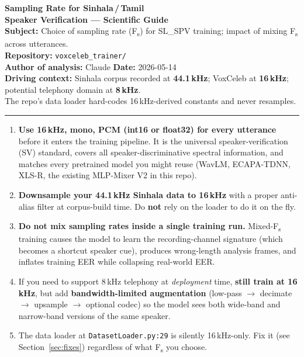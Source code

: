 \documentclass[11pt,a4paper]{article}
\begin{document}
\begin{center}
  {\LARGE\bfseries Sampling Rate for Sinhala\,/\,Tamil\\[4pt]
  Speaker Verification --- Scientific Guide}\\[10pt]
  {\normalsize
  \textbf{Subject:} Choice of sampling rate (F\textsubscript{s}) for SL\_SPV training; impact of mixing F\textsubscript{s} across utterances.\\
  \textbf{Repository:} \texttt{voxceleb\_trainer/}\\
  \textbf{Author of analysis:} Claude \quad \textbf{Date:} 2026-05-14\\[4pt]
  \textbf{Driving context:} Sinhala corpus recorded at \textbf{44.1\,kHz}; VoxCeleb at \textbf{16\,kHz};
  potential telephony domain at \textbf{8\,kHz}.\\ The repo's data loader hard-codes 16\,kHz-derived
  constants and never resamples.
  }
\end{center}
\vspace{4pt}
\rule{\linewidth}{0.8pt}
\vspace{4pt}

\begin{tldrbox}
\begin{enumerate}[leftmargin=*, label=\textbf{\arabic*.}]
  \item \textbf{Use 16\,kHz, mono, PCM (int16 or float32) for every utterance} before it enters the
    training pipeline. It is the universal speaker-verification (SV) standard, covers all
    speaker-discriminative spectral information, and matches every pretrained model you might reuse
    (WavLM, ECAPA-TDNN, XLS-R, the existing MLP-Mixer V2 in this repo).

  \item \textbf{Downsample your 44.1\,kHz Sinhala data to 16\,kHz} with a proper anti-alias filter
    at corpus-build time. Do \textbf{not} rely on the loader to do it on the fly.

  \item \textbf{Do not mix sampling rates inside a single training run.} Mixed-F\textsubscript{s}
    training causes the model to learn the recording-channel signature (which becomes a shortcut
    speaker cue), produces wrong-length analysis frames, and inflates training EER while collapsing
    real-world EER.

  \item If you need to support 8\,kHz telephony at \emph{deployment} time, \textbf{still train at
    16\,kHz}, but add \textbf{bandwidth-limited augmentation} (low-pass $\to$ decimate $\to$ upsample
    $\to$ optional codec) so the model sees both wide-band and narrow-band versions of the same speaker.

  \item The data loader at \texttt{DatasetLoader.py:29} is silently 16\,kHz-only. Fix it (see
    Section~\ref{sec:fixes}) regardless of what F\textsubscript{s} you choose.
\end{enumerate}
\end{tldrbox}
\end{document}

